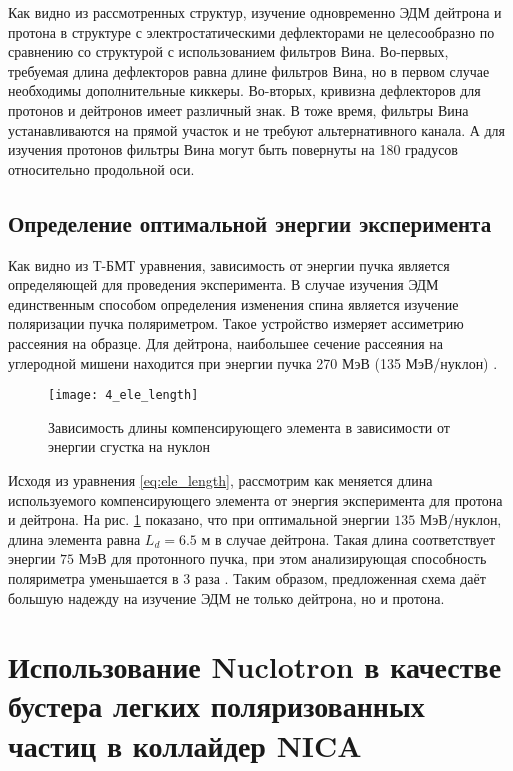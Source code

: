 \par  Как видно из рассмотренных структур, изучение одновременно ЭДМ дейтрона и протона в структуре с электростатическими дефлекторами не целесообразно по сравнению со структурой с использованием фильтров Вина. Во-первых, требуемая длина дефлекторов равна длине фильтров Вина, но в первом случае необходимы дополнительные киккеры. Во-вторых, кривизна дефлекторов для протонов и дейтронов имеет различный знак. В тоже время, фильтры Вина устанавливаются на прямой участок и не требуют альтернативного канала. А для изучения протонов фильтры Вина могут быть повернуты на 180 градусов относительно продольной оси.

	\subsection{Определение оптимальной энергии эксперимента}\label{sec:EDM/requirements/energy}
\par Как видно из Т-БМТ уравнения, зависимость от энергии пучка является определяющей для проведения эксперимента. В случае изучения ЭДМ единственным способом определения изменения спина является изучение поляризации пучка поляриметром. Такое устройство измеряет ассиметрию рассеяния на образце. Для дейтрона, наибольшее сечение рассеяния на углеродной мишени находится при энергии пучка 270 МэВ (135 МэВ/нуклон) \cite{JEDI:polarimeter, skhomenko:polarimeter}.

\begin{figure}[!h]
  \centering
	\texttt{[image: 4\_ele\_length]}
   \caption{Зависимость длины компенсирующего элемента в зависимости от энергии сгустка на нуклон}
   \label{fig:4_ele_length}
\end{figure}

\par Исходя из уравнения \ref{eq:ele_length}, рассмотрим как меняется длина используемого компенсирующего элемента от энергия эксперимента для протона и дейтрона. На рис. \ref{fig:4_ele_length} показано, что при оптимальной энергии $135$ МэВ/нуклон, длина элемента равна $L_d = 6.5$ м в случае дейтрона. Такая длина соответствует энергии $75$ МэВ для протонного пучка, при этом анализирующая способность поляриметра уменьшается в 3 раза \cite{mcnaughton:polarimeter}. Таким образом, предложенная схема даёт большую надежду на изучение ЭДМ не только дейтрона, но и протона.
	
	\section{Использование Nuclotron в качестве бустера легких поляризованных частиц в коллайдер NICA}\label{sec:EDM/nuclotron}
	
